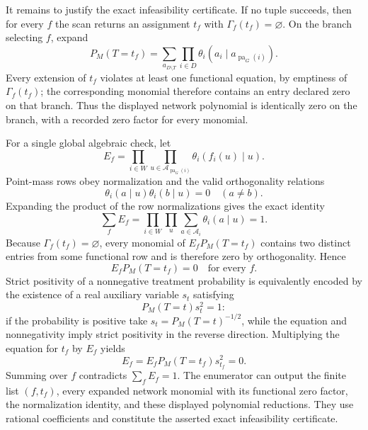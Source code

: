 It remains to justify the exact infeasibility certificate.  If no tuple succeeds, then for every \(f\) the scan returns an assignment \(t_f\) with \(\Gamma_f(t_f)=\varnothing\).  On the branch selecting \(f\), expand
\[
 P_M(T=t_f)
 =\sum_{a_{D\setminus T}}
   \prod_{i\in D}
   \theta_i(a_i\mid a_{\operatorname{pa}_G(i)}).
\]
Every extension of \(t_f\) violates at least one functional equation, by emptiness of \(\Gamma_f(t_f)\); the corresponding monomial therefore contains an entry declared zero on that branch.  Thus the displayed network polynomial is identically zero on the branch, with a recorded zero factor for every monomial.

For a single global algebraic check, let
\[
 E_f=\prod_{i\in W}\prod_{u\in
 \mathcal A_{\operatorname{pa}_G(i)}}
 \theta_i(f_i(u)\mid u).
\]
Point-mass rows obey normalization and the valid orthogonality relations
\[
 \theta_i(a\mid u)\theta_i(b\mid u)=0
 \quad(a\ne b).
\]
Expanding the product of the row normalizations gives the exact identity
\[
 \sum_f E_f
 =\prod_{i\in W}\prod_u\sum_{a\in\mathcal A_i}
   \theta_i(a\mid u)=1.
\]
Because \(\Gamma_f(t_f)=\varnothing\), every monomial of
\(E_fP_M(T=t_f)\) contains two distinct entries from some functional row and is therefore zero by orthogonality.  Hence
\[
 E_fP_M(T=t_f)=0
 \quad\text{for every }f.
\]
Strict positivity of a nonnegative treatment probability is equivalently encoded by the existence of a real auxiliary variable \(s_t\) satisfying
\[
 P_M(T=t)s_t^2=1:
\]
if the probability is positive take \(s_t=P_M(T=t)^{-1/2}\), while the equation and nonnegativity imply strict positivity in the reverse direction.  Multiplying the equation for \(t_f\) by \(E_f\) yields
\[
 E_f=E_fP_M(T=t_f)s_{t_f}^2=0.
\]
Summing over \(f\) contradicts \(\sum_fE_f=1\).  The enumerator can output the finite list \((f,t_f)\), every expanded network monomial with its functional zero factor, the normalization identity, and these displayed polynomial reductions.  They use rational coefficients and constitute the asserted exact infeasibility certificate.